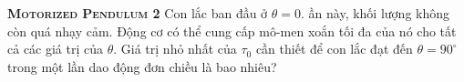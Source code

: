 \begin{problem}
\textbf{\textsc{Motorized Pendulum 2}}
Con lắc ban đầu ở $\theta=0$. ần này, khối lượng không còn quá nhạy cảm. Động cơ có thể cung cấp mô-men xoắn tối đa của nó cho tất cả các giá trị của $\theta$. Giá trị nhỏ nhất của $\tau_0$ cần thiết để con lắc đạt đến $\theta=90^{\circ}$ trong một lần dao động đơn chiều là bao nhiêu?    



\end{problem}
    